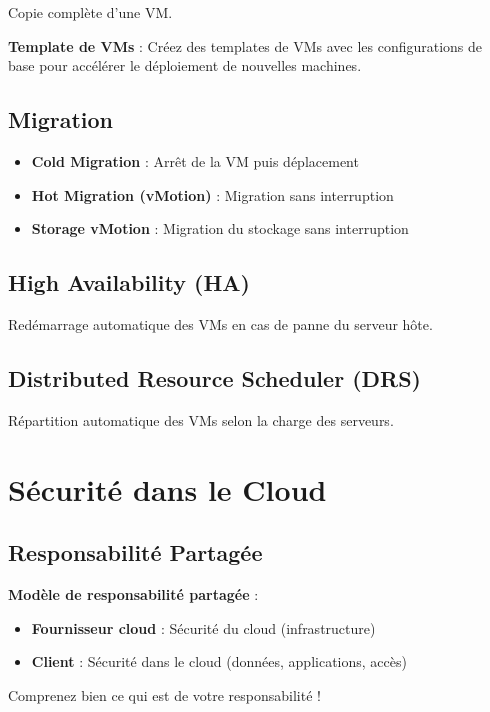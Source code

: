 \documentclass[11pt,a4paper]{article}
\begin{document}
Copie complète d'une VM.

\begin{tipbox}
\textbf{Template de VMs} : Créez des templates de VMs avec les configurations de base pour accélérer le déploiement de nouvelles machines.
\end{tipbox}

\subsection{Migration}

\begin{itemize}
    \item \textbf{Cold Migration} : Arrêt de la VM puis déplacement
    \item \textbf{Hot Migration (vMotion)} : Migration sans interruption
    \item \textbf{Storage vMotion} : Migration du stockage sans interruption
\end{itemize}

\subsection{High Availability (HA)}

Redémarrage automatique des VMs en cas de panne du serveur hôte.

\subsection{Distributed Resource Scheduler (DRS)}

Répartition automatique des VMs selon la charge des serveurs.

\section{Sécurité dans le Cloud}

\subsection{Responsabilité Partagée}

\begin{importantbox}
\textbf{Modèle de responsabilité partagée} : 
\begin{itemize}
    \item \textbf{Fournisseur cloud} : Sécurité du cloud (infrastructure)
    \item \textbf{Client} : Sécurité dans le cloud (données, applications, accès)
\end{itemize}
Comprenez bien ce qui est de votre responsabilité !
\end{importantbox}
\end{document}
